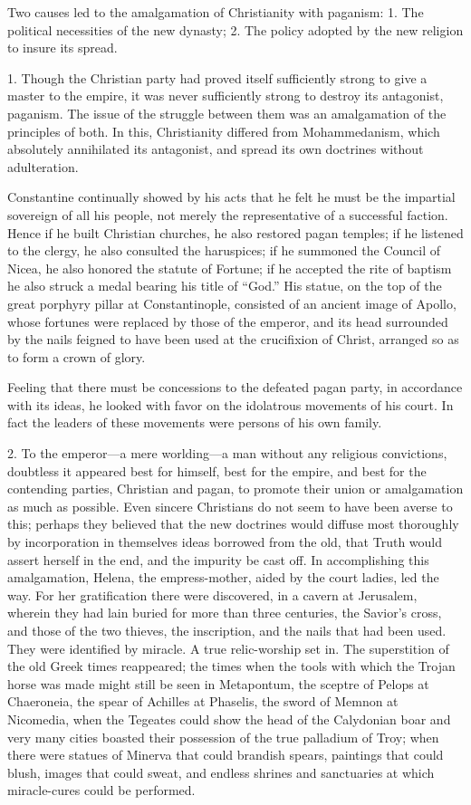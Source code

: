 Two causes led to the amalgamation of Christianity with paganism: 1. The political
necessities of the new dynasty; 2. The policy adopted by the new religion to insure its spread.

1. Though the Christian party had proved itself sufficiently strong to give a master to the
empire, it was never sufficiently strong to destroy its antagonist, paganism. The issue of the
struggle between them was an amalgamation of the principles of both. In this, Christianity
differed from Mohammedanism, which absolutely annihilated its antagonist, and spread its
own doctrines without adulteration.

Constantine continually showed by his acts that he felt he must be the impartial sovereign of
all his people, not merely the representative of a successful faction. Hence if he built
Christian churches, he also restored pagan temples; if he listened to the clergy, he also
consulted the haruspices; if he summoned the Council of Nicea, he also honored the statute
of Fortune; if he accepted the rite of baptism he also struck a medal bearing his title of
``God.'' His statue, on the top of the great porphyry pillar at Constantinople, consisted of an
ancient image of Apollo, whose fortunes were replaced by those of the emperor, and its head
surrounded by the nails feigned to have been used at the crucifixion of Christ, arranged so as
to form a crown of glory.

Feeling that there must be concessions to the defeated pagan party, in accordance with its
ideas, he looked with favor on the idolatrous movements of his court. In fact the leaders of
these movements were persons of his own family.

2. To the emperor—a mere worlding—a man without any religious convictions, doubtless it
appeared best for himself, best for the empire, and best for the contending parties, Christian
and pagan, to promote their union or amalgamation as much as possible. Even sincere
Christians do not seem to have been averse to this; perhaps they believed that the new
doctrines would diffuse most thoroughly by incorporation in themselves ideas borrowed from
the old, that Truth would assert herself in the end, and the impurity be cast off. In
accomplishing this amalgamation, Helena, the empress-mother, aided by the court ladies, led
the way. For her gratification there were discovered, in a cavern at Jerusalem, wherein they
had lain buried for more than three centuries, the Savior's cross, and those of the two thieves,
the inscription, and the nails that had been used. They were identified by miracle. A true
relic-worship set in. The superstition of the old Greek times reappeared; the times when the
tools with which the Trojan horse was made might still be seen in Metapontum, the sceptre
of Pelops at Chaeroneia, the spear of Achilles at Phaselis, the sword of Memnon at
Nicomedia, when the Tegeates could show the head of the Calydonian boar and very many
cities boasted their possession of the true palladium of Troy; when there were statues of
Minerva that could brandish spears, paintings that could blush, images that could sweat, and
endless shrines and sanctuaries at which miracle-cures could be performed.

